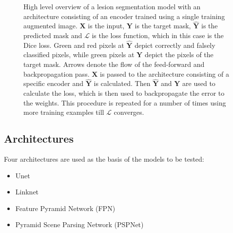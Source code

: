 \documentclass{elsarticle}
\providecommand{\FILEPATH}{~/github.com/pbizopoulos/comprehensive-comparison-of-deep-learning-models-for-lung-and-covid-19-lesion-segmentation-in-ct/packages/python/tmp}
\begin{document}
\begin{figure}[!t]
  \centering
  \caption{High level overview of a lesion segmentation model with an architecture consisting of an encoder trained using a single training augmented image.
    $\bm{X}$ is the input, $\bm{Y}$ is the target mask, $\hat{\bm{Y}}$ is the predicted mask and $\mathcal{L}$ is the loss function, which in this case is the Dice loss.
    Green and red pixels at $\hat{\bm{Y}}$ depict correctly and falsely classified pixels, while green pixels at $\bm{Y}$ depict the pixels of the target mask.
    Arrows denote the flow of the feed-forward and backpropagation pass.
    $\bm{X}$ is passed to the architecture consisting of a specific encoder and $\hat{\bm{Y}}$ is calculated.
    Then $\hat{\bm{Y}}$ and $\bm{Y}$ are used to calculate the loss, which is then used to backpropagate the error to the weights.
  This procedure is repeated for a number of times using more training examples till $\mathcal{L}$ converges.}\label{fig:highleveloverview}
\end{figure}

\subsection{Architectures}\label{sec:architectures}
Four architectures are used as the basis of the models to be tested:
\begin{itemize}
  \item Unet~\cite{ronneberger2015u}
  \item Linknet~\cite{chaurasia2017linknet}
  \item Feature Pyramid Network (FPN)~\cite{lin2017feature}
  \item Pyramid Scene Parsing Network (PSPNet)~\cite{zhao2017pyramid}
\end{itemize}
\end{document}
